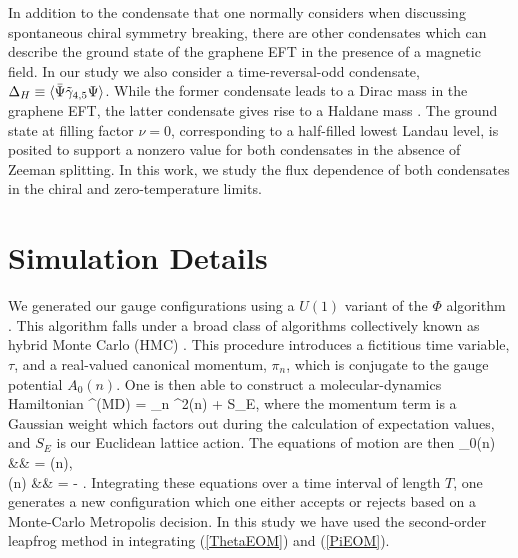 \documentclass[aps,prd,twocolumn,showpacs,superscriptaddress,groupedaddress]{revtex4}  %
\begin{document}
In addition to the condensate that one normally considers when discussing spontaneous chiral symmetry breaking, there are other condensates which can describe the ground state of the graphene EFT
in the presence of a magnetic field. In our study we also consider a time-reversal-odd condensate, $\Delta_H \equiv {\langle  {\bar \Psi}\tilde{\gamma}_{4,5} \Psi \rangle}$. While the former condensate leads to a Dirac
mass in the graphene EFT, the latter condensate gives rise to a Haldane mass \cite{Haldane}. The ground state at filling factor $\nu=0$, corresponding to a half-filled lowest Landau level, is posited to support a nonzero value for both condensates in the absence of Zeeman splitting. In this work,
we study the flux dependence of both condensates in the chiral and zero-temperature limits.
\section{\label{sec:Simulation}Simulation Details}
We generated our gauge configurations using a $U(1)$ variant of the $\Phi$ algorithm \cite{PhiAlgorithm}. This algorithm falls under a broad class of algorithms collectively known as
hybrid Monte Carlo (HMC) \cite{KogutDuane}. This procedure introduces a fictitious time variable, $\tau$, and a real-valued canonical momentum, $\pi_n$, which is conjugate to the gauge potential $A_0(n)$. One is then able to construct a molecular-dynamics Hamiltonian
\beq
\label{HMCHamiltonian}
^{(MD)} =  \sum_n \pi^2(n) + S_E,
\eeq
where the momentum term is a Gaussian weight which factors out during the calculation of expectation values, and $S_E$ is our Euclidean lattice action. The equations of motion are then 
\beq
\label{ThetaEOM}
_0(n) &\equiv&  = \pi(n), \\
\label{PiEOM}
\dot{\pi}(n) &\equiv&  = - .
\eeq
Integrating these equations over a time interval of length $T$, one generates a new configuration which one either accepts or rejects based on a Monte-Carlo Metropolis decision.
In this study we have used the second-order leapfrog method in integrating (\ref{ThetaEOM}) and (\ref{PiEOM}).
\end{document}

